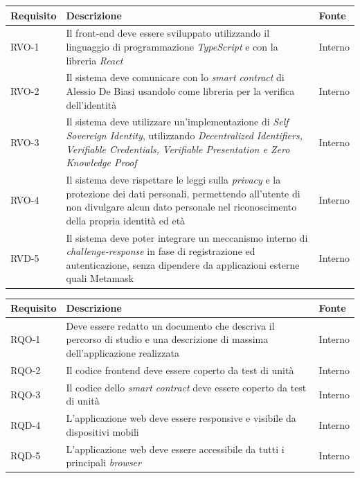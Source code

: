 
\begin{center}
\label{tab:requisiti-vincolo}
\begin{tabularx}{\textwidth}{|>{\hsize=0.4\hsize\centering\arraybackslash}X|>{\hsize=2.2\hsize\centering}X|>{\hsize=0.4\hsize\centering\arraybackslash}X|}
\hline
\textbf{Requisito} & \textbf{Descrizione} & \textbf{Fonte}\\
\hline
RVO-1 & Il front-end deve essere sviluppato utilizzando il linguaggio di programmazione \textit{TypeScript} e con la libreria \textit{React} & Interno \\
\hline
RVO-2 & Il sistema deve comunicare con lo \textit{smart contract} di Alessio De Biasi usandolo come libreria per la verifica dell'identità & Interno \\
\hline
RVO-3 & Il sistema deve utilizzare un'implementazione di \textit{Self Sovereign Identity}, utilizzando \textit{Decentralized Identifiers, Verifiable Credentials, Verifiable Presentation e Zero Knowledge Proof} & Interno \\
\hline
RVO-4 & Il sistema deve rispettare le leggi sulla \textit{privacy} e la protezione dei dati personali, permettendo all'utente di non divulgare alcun dato personale nel riconoscimento della propria identità ed età & Interno \\
\hline
RVD-5 & Il sistema deve poter integrare un meccanismo interno di \textit{challenge-response} in fase di registrazione ed autenticazione, senza dipendere da applicazioni esterne quali Metamask & Interno \\
\hline
\end{tabularx}
\end{center}
  
\begin{center}
\label{tab:requisiti-qualitativi}
\begin{tabularx}{\textwidth}{|>{\hsize=0.4\hsize\centering\arraybackslash}X|>{\hsize=2.2\hsize\centering}X|>{\hsize=0.4\hsize\centering\arraybackslash}X|}
\hline
\textbf{Requisito} & \textbf{Descrizione} & \textbf{Fonte} \\
\hline
RQO-1    & Deve essere redatto un documento che descriva il percorso di studio e una descrizione di massima dell'applicazione realizzata & Interno \\
\hline
RQO-2    & Il codice frontend deve essere coperto da test di unità & Interno \\
\hline
RQO-3    & Il codice dello \textit{smart contract} deve essere coperto da test di unità & Interno \\
\hline
RQD-4    & L'applicazione web deve essere responsive e visibile da dispositivi mobili & Interno \\
\hline
RQD-5    & L'applicazione web deve essere accessibile da tutti i principali \textit{browser} & Interno \\
\hline
\end{tabularx}
\end{center}